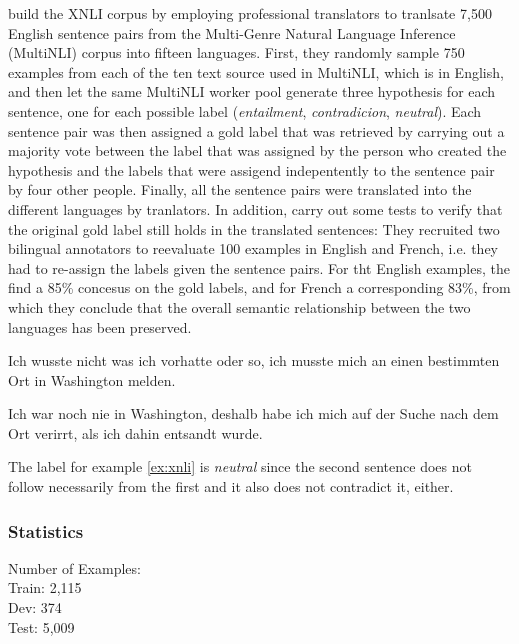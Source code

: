 \cite{conneau2018xnli} build the XNLI corpus by employing professional translators to tranlsate 7,500 English sentence pairs from the Multi-Genre Natural Language Inference (MultiNLI) corpus \cite{williams2017broad} into fifteen languages.
First, they randomly sample 750 examples from each of the ten text source used in MultiNLI, which is in English, and then let the same MultiNLI worker pool generate three hypothesis for each sentence, one for each possible label (\emph{entailment}, \emph{contradicion}, \emph{neutral}).
Each sentence pair was then assigned a gold label that was retrieved by carrying out a majority vote between the label that was assigned by the person who created the hypothesis and the labels that were assigend indepentently to the sentence pair by four other people.
Finally, all the sentence pairs were translated into the different languages by tranlators.
In addition, \cite{conneau2018xnli} carry out some tests to verify that the original gold label still holds in the translated sentences:
They recruited two bilingual annotators to reevaluate 100 examples in English and French, i.e. they had to re-assign the labels given the sentence pairs.
For tht English examples, the find a 85\% concesus on the gold labels, and for French a corresponding 83\%, from which they conclude that the overall semantic relationship between the two languages has been preserved.


\begin{examples}
	\label{ex:xnli}
	\item Ich wusste nicht was ich vorhatte oder so, ich musste mich an einen bestimmten Ort in Washington melden.

        Ich war noch nie in Washington, deshalb habe ich mich auf der Suche nach dem Ort verirrt, als ich dahin entsandt wurde.
\end{examples}

The label for example \ref{ex:xnli} is \emph{neutral} since the second sentence does not follow necessarily from the first and it also does not contradict it, either.

\subsubsection{Statistics}

Number of Examples: \\
Train: 2,115 \\
Dev: 374 \\
Test: 5,009


